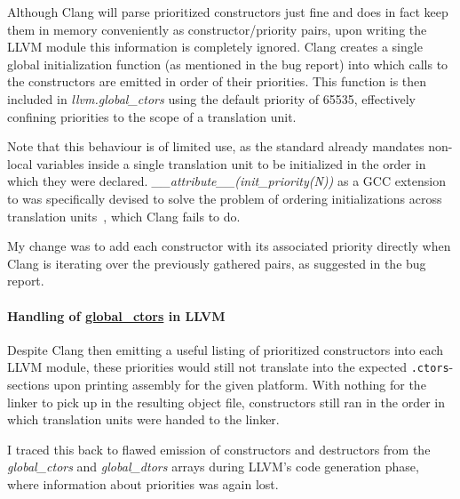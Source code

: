 Although Clang will parse prioritized constructors just fine and does in fact
keep them in memory conveniently as constructor/priority pairs, upon writing
the LLVM module this information is completely ignored. Clang creates a single
global initialization function (as mentioned in the bug report) into which
calls to the constructors are emitted in order of their priorities. This
function is then included in \emph{llvm.global\_ctors} using the default
priority of 65535, effectively confining priorities to the scope of
a translation unit.

\begin{framed}

Note that this behaviour is of limited use, as the \CPP standard already
mandates non-local variables inside a single translation unit to be initialized
in the order in which they were declared.
\emph{\_\_attribute\_\_(init\_priority(N))} as a GCC extension to \CPP was
specifically devised to solve the problem of ordering initializations across
translation units~\cite{gcc-initpriority}, which Clang fails to do.


\end{framed}

My change was to add each constructor with its associated priority directly
when Clang is iterating over the previously gathered pairs, as suggested in the
bug report.


\paragraph{Handling of \url{global\_ctors} in LLVM}

Despite Clang then emitting a useful listing of prioritized constructors into
each LLVM module, these priorities would still not translate into the expected
\texttt{.ctors}-sections upon printing assembly for the given platform.  With
nothing for the linker to pick up in the
resulting object file, constructors still ran in the order in which translation
units were handed to the linker.

I traced this back to flawed emission of constructors and destructors from the
\emph{global\_ctors} and \emph{global\_dtors} arrays during LLVM's code
generation phase, where information about priorities was again lost.

